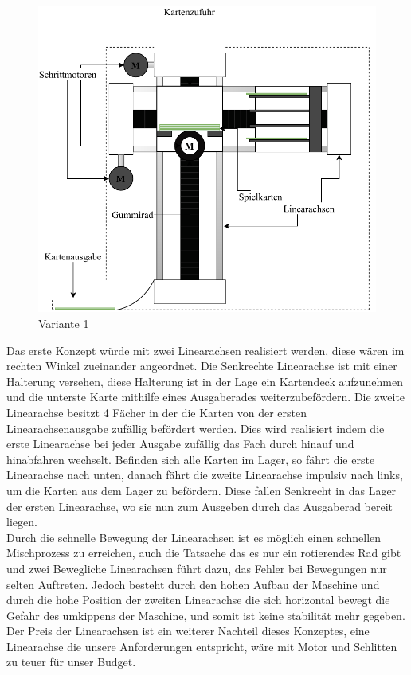 \begin{figure}[hb]
    \centering
    \includegraphics[scale=0.5,page=1]{fig/mech/Version1}
    \caption{Variante 1}
\end{figure}


Das erste Konzept würde mit zwei Linearachsen realisiert werden, diese wären im rechten Winkel zueinander
angeordnet. Die Senkrechte Linearachse ist mit einer Halterung versehen, diese Halterung ist in der Lage
ein Kartendeck aufzunehmen und die unterste Karte mithilfe eines Ausgaberades weiterzubefördern. Die zweite
Linearachse besitzt 4 Fächer in der die Karten von der ersten Linearachsenausgabe zufällig befördert werden.
Dies wird realisiert indem die erste Linearachse bei jeder Ausgabe zufällig das Fach durch hinauf und
hinabfahren wechselt. Befinden sich alle Karten im Lager, so fährt die erste Linearachse nach unten, danach
fährt die zweite Linearachse impulsiv nach links, um die Karten aus dem Lager zu befördern. Diese fallen
Senkrecht in das Lager der ersten Linearachse, wo sie nun zum Ausgeben durch das Ausgaberad bereit liegen. \\



Durch die schnelle Bewegung der Linearachsen ist es möglich einen schnellen Mischprozess zu erreichen,
auch die Tatsache das es nur ein rotierendes Rad gibt und zwei Bewegliche Linearachsen führt dazu, das
Fehler bei Bewegungen nur selten Auftreten. Jedoch besteht durch den hohen Aufbau der Maschine und durch die hohe
Position der zweiten Linearachse die sich horizontal bewegt die Gefahr des umkippens der Maschine, und somit ist
keine stabilität mehr gegeben. Der Preis der Linearachsen ist ein weiterer Nachteil dieses Konzeptes, eine Linearachse
die unsere Anforderungen entspricht, wäre mit Motor und Schlitten zu teuer für unser Budget. \\

